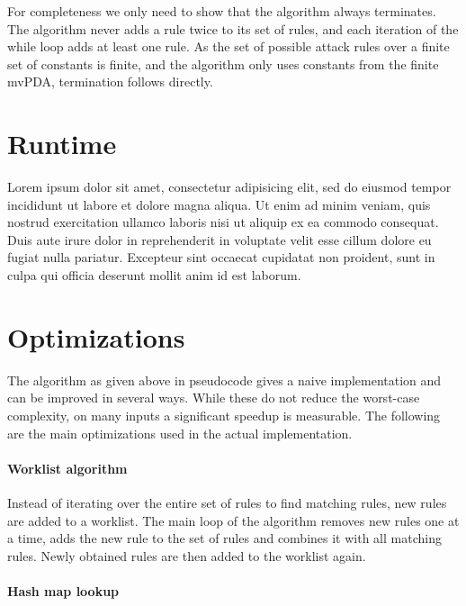 For completeness we only need to show that the algorithm always terminates.
The algorithm never adds a rule twice to its set of rules, and each iteration
of the while loop adds at least one rule.
As the set of possible attack rules over a finite set of constants is finite,
and the algorithm only uses constants from the finite mvPDA, termination
follows directly.


\section{Runtime}

Lorem ipsum dolor sit amet, consectetur adipisicing elit, sed do eiusmod tempor incididunt ut labore et dolore magna aliqua. Ut enim ad minim veniam, quis nostrud exercitation ullamco laboris nisi ut aliquip ex ea commodo consequat. Duis aute irure dolor in reprehenderit in voluptate velit esse cillum dolore eu fugiat nulla pariatur. Excepteur sint occaecat cupidatat non proident, sunt in culpa qui officia deserunt mollit anim id est laborum.


\section{Optimizations}

The algorithm as given above in pseudocode gives a naive implementation and can be improved
in several ways. While these do not reduce the worst-case complexity,
on many inputs a significant speedup is measurable.
The following are the main optimizations used in the actual implementation.

\paragraph{Worklist algorithm}

Instead of iterating over the entire set of rules to find matching rules, new rules are
added to a worklist.
The main loop of the algorithm removes new rules one at a time, adds
the new rule to the set of rules and combines it with all matching rules.
Newly obtained rules are then added to the worklist again. 

\paragraph{Hash map lookup}

